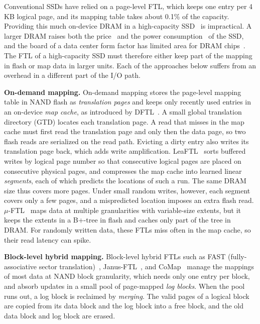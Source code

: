 Conventional SSDs have relied on a page-level FTL, which keeps one entry per 4\,KB logical page, and its mapping table takes about
0.1\% of the capacity. Providing this much on-device
DRAM in a high-capacity SSD~\cite{solidigm-122tb} is impractical. A larger DRAM raises both
the price~\cite{zns,trendforce-dram-1q26} and the power consumption~\cite{leaftl} of the SSD, and
the board of a data center form factor has limited area for DRAM chips~\cite{sff-e3}.
The FTL of a high-capacity SSD must therefore either keep part of the mapping in
flash or map data in larger units. Each of the approaches below suffers from an overhead
in a different part of the I/O path.

\textbf{On-demand mapping.}
On-demand mapping stores the page-level mapping table in NAND flash as
\emph{translation pages} and keeps only recently used entries in an on-device
\emph{map cache}, as introduced by DFTL~\cite{dftl}. A small global translation
directory (GTD) locates each translation page. A read that misses in the map cache must first read the
translation page and only then the data page, so two flash reads are
serialized on the read path. Evicting a dirty entry also writes its translation page
back, which adds write amplification. LeaFTL~\cite{leaftl} sorts buffered
writes by logical page number so that consecutive logical pages are placed on
consecutive physical pages, and compresses the map cache into learned linear
\emph{segments}, each of which predicts the locations of such a run. The same DRAM size thus
covers more pages. Under small random writes, however, each segment covers only a
few pages, and a mispredicted location imposes an extra flash read. $\mu$-FTL~\cite{mftl}
maps data at multiple granularities with variable-size extents, but it keeps the
extents in a B+-tree in flash and caches only part of the tree in DRAM. For randomly
written data, these FTLs miss often in the map cache, so their read latency can
spike.

\textbf{Block-level hybrid mapping.}
Block-level hybrid FTLs such as FAST (fully-associative sector
translation)~\cite{fast}, Janus-FTL~\cite{janusftl}, and CoMap~\cite{comap} manage the mappings of most data at NAND block granularity,
which needs only one entry per block, and absorb updates in a small pool of
page-mapped \emph{log blocks}. When the pool runs out, a log block is reclaimed
by \emph{merging}. The valid pages of a logical block are copied from its data
block and the log block into a free block, and the old data block and log block
are erased.

